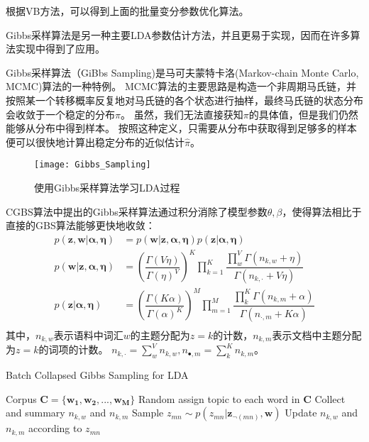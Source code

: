 根据VB方法，可以得到上面的批量变分参数优化算法。

Gibbs采样算法是另一种主要LDA参数估计方法，并且更易于实现，因而在许多算法实现中得到了应用\cite{Liu:2011:PPL:1961189.1961198, Peacock, li2014scaling}。 

Gibbs采样算法（GiBbs Sampling)是马可夫蒙特卡洛(Markov-chain Monte Carlo, MCMC)算法的一种特例\cite{mackay2002information, hesterberg2012monte}。
MCMC算法的主要思路是构造一个非周期马氏链，并按照某一个转移概率反复地对马氏链的各个状态进行抽样，最终马氏链的状态分布会收敛于一个稳定的分布$\pi$。
虽然，我们无法直接获知$\pi$的具体值，但是我们仍然能够从分布中得到样本。
按照这种定义，只需要从分布中获取得到足够多的样本便可以很快地计算出稳定分布的近似估计$\hat{\pi}$。

\begin{figure}[htb]\centering
  \texttt{[image: Gibbs\_Sampling]}
  \caption{使用Gibbs采样算法学习LDA过程}
  \label{fig:Gibbs_Sampling}       %
\end{figure}

CGBS算法中提出的Gibbs采样算法通过积分消除了模型参数$\theta, \beta$，使得算法相比于直接的GBS算法能够更快地收敛：
\begin{equation}
\label{eq:pzw}
\begin{aligned}
p(\mathbf{z , w | \alpha, \eta}) &= p(\mathbf{w | z , \alpha, \eta}) p(\mathbf{z| \alpha, \eta}) \\
p(\mathbf{w | z, \alpha, \eta})                &= \left( \dfrac{\Gamma(V\eta)}{\Gamma(\eta)^V} \right)^K
\prod_{k=1}^K{\dfrac{ \prod_w^V \Gamma( n_{k,w} + \eta )}{\Gamma( n_{k, \cdot}+ V \eta)}} \\
p(\mathbf{z | \alpha, \eta})                    &=\left( \dfrac{\Gamma(K\alpha)}{\Gamma(\alpha)^K} \right)^M
\prod_{m=1}^M{\dfrac{ \prod_k^K \Gamma( n_{k,m} + \alpha)}{\Gamma( n_{\cdot, m}+ K \alpha)}} \\
\end{aligned}
\end{equation}
其中，$n_{k,w}$表示语料中词汇$w$的主题分配为$z=k$的计数，$n_{k, m}$表示文档中主题分配为$z=k$的词项的计数。
$n_{k, \cdot} = \sum_w^V{n_{k, w}} , n_{\bullet, m} = \sum_k^K{ n_{k, m}}$。

\begin{algorithm}[htb]
\caption{ Batch Collapsed Gibbs Sampling for LDA} 
\label{alg:bcgbs}
\begin{algorithmic}[1] 
\Require Corpus $\mathbf{C = \{w_1, w_2, ..., w_M\}}$
\State Random assign topic to each word in $\mathbf{C}$
\State Collect and summary $n_{k, w}$ and $n_{k, m}$
\State Sample $z_{mn} \sim p(z_{mn} | \mathbf{z}_{\neg (mn)}, \mathbf{w}) $
\State Update  $n_{k, w}$ and $n_{k, m}$ according to $z_{mn}$
\EndFor
\EndFor
\EndWhile
\end{algorithmic}  
\end{algorithm}  

